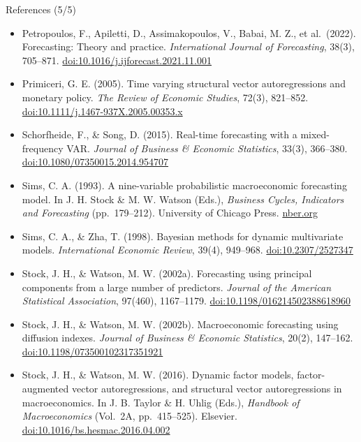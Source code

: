 \begin{frame}{References (5/5)}
\itemsize{\tiny}
\begin{itemize}
    \item Petropoulos, F., Apiletti, D., Assimakopoulos, V., Babai, M. Z., et al.\ (2022). Forecasting: Theory and practice. \textit{International Journal of Forecasting}, 38(3), 705--871. \href{https://doi.org/10.1016/j.ijforecast.2021.11.001}{doi:10.1016/j.ijforecast.2021.11.001}
    \item Primiceri, G. E. (2005). Time varying structural vector autoregressions and monetary policy. \textit{The Review of Economic Studies}, 72(3), 821--852. \href{https://doi.org/10.1111/j.1467-937X.2005.00353.x}{doi:10.1111/j.1467-937X.2005.00353.x}
    \item Schorfheide, F., \& Song, D. (2015). Real-time forecasting with a mixed-frequency VAR. \textit{Journal of Business \& Economic Statistics}, 33(3), 366--380. \href{https://doi.org/10.1080/07350015.2014.954707}{doi:10.1080/07350015.2014.954707}
    \item Sims, C. A. (1993). A nine-variable probabilistic macroeconomic forecasting model. In J. H. Stock \& M. W. Watson (Eds.), \textit{Business Cycles, Indicators and Forecasting} (pp.\ 179--212). University of Chicago Press. \href{https://www.nber.org/books-and-chapters/business-cycles-indicators-and-forecasting/nine-variable-probabilistic-macroeconomic-forecasting-model}{nber.org}
    \item Sims, C. A., \& Zha, T. (1998). Bayesian methods for dynamic multivariate models. \textit{International Economic Review}, 39(4), 949--968. \href{https://doi.org/10.2307/2527347}{doi:10.2307/2527347}
    \item Stock, J. H., \& Watson, M. W. (2002a). Forecasting using principal components from a large number of predictors. \textit{Journal of the American Statistical Association}, 97(460), 1167--1179. \href{https://doi.org/10.1198/016214502388618960}{doi:10.1198/016214502388618960}
    \item Stock, J. H., \& Watson, M. W. (2002b). Macroeconomic forecasting using diffusion indexes. \textit{Journal of Business \& Economic Statistics}, 20(2), 147--162. \href{https://doi.org/10.1198/073500102317351921}{doi:10.1198/073500102317351921}
    \item Stock, J. H., \& Watson, M. W. (2016). Dynamic factor models, factor-augmented vector autoregressions, and structural vector autoregressions in macroeconomics. In J. B. Taylor \& H. Uhlig (Eds.), \textit{Handbook of Macroeconomics} (Vol.\ 2A, pp.\ 415--525). Elsevier. \href{https://doi.org/10.1016/bs.hesmac.2016.04.002}{doi:10.1016/bs.hesmac.2016.04.002}

\end{itemize}
\end{frame}
